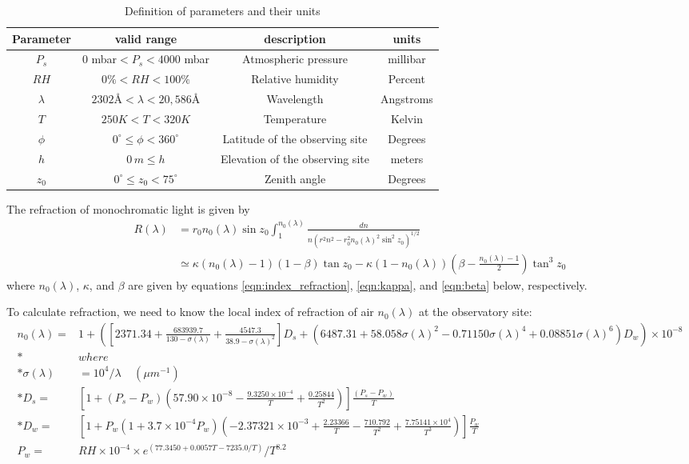 \documentclass[]{article}
\begin{document}
\begin{table}[h!]
	\begin{center}
	\begin{tabular}{c | c | c | c}
		Parameter & valid range & description & units \\
		\hline
		$P_s$& $0$ mbar$ < P_s < 4000$ mbar & Atmospheric pressure & millibar  \\
		$RH$ & $0\% < RH < 100\%$ & Relative humidity & Percent \\
		$\lambda$& $2302$\AA{}$ < \lambda < 20,586 $\AA{} & Wavelength  & Angstroms \\
		$T$& $250K < T < 320K$ & Temperature & Kelvin \\
		$\phi$ & $0^\circ \leq \phi < 360^\circ$ & Latitude of the observing site & Degrees \\
		$h$ & $0\,m\leq h$ & Elevation of the observing site & meters \\
		$z_0$ & $0^\circ\leq z_0 < 75^\circ$ & Zenith angle & Degrees
		
	\end{tabular}
	\end{center}
	\caption{Definition of parameters and their units}
	\label{table:parameters}
\end{table}

The refraction of monochromatic light is given by
\begin{align}
R(\lambda) &= r_0 n_0(\lambda) \sin z_0 \int_1^{n_0(\lambda)} \frac{dn}{n \left(r^2n^2 -r_0^2n_0(\lambda)^2\sin^2z_0\right)^{1/2}} \nonumber\\
&\simeq \kappa (n_0(\lambda) - 1) (1 - \beta) \tan z_0 - \kappa (1 - n_0(\lambda)) \left(\beta - \frac{n_0(\lambda) - 1}{2}\right) \tan^3z_0
\end{align}
where $n_0(\lambda)$, $\kappa$, and $\beta$ are given by equations \ref{eqn:index_refraction}, \ref{eqn:kappa}, and \ref{eqn:beta} below, respectively.

To calculate refraction, we need to know the local index of refraction of air $n_0(\lambda)$ at the observatory site:
\begin{align}
	n_0(\lambda) =&1 + \left(\left[2371.34 +\frac{683939.7}{130 - \sigma(\lambda)} +\frac{4547.3}{38.9 - \sigma(\lambda)^2}\right] D_s 
		+ \left(6487.31 + 58.058 \sigma(\lambda)^2 - 0.71150 \sigma(\lambda)^4 +0.08851 \sigma(\lambda)^6\right) D_w \right)\times 10^{-8} \label{eqn:index_refraction}\\*
	& where \nonumber\\*
	\sigma(\lambda) &= 10^4 /\lambda \;\;\;\;\left(\mu m^{-1}\right)\nonumber \\*
	D_s =& \left[1 + (P_s-P_w) \left(57.90\times10^{-8} - \frac{9.3250\times10^{-4}}{T}+\frac{0.25844}{T^2}\right)\right] \frac{(P_s-P_w)}{T} \nonumber \\*
	D_w =& \left[1 + P_w \left(1 + 3.7\times10^{-4} P_w\right)\left(-2.37321\times10^{-3} + \frac{2.23366}{T} - \frac{710.792}{T^2} + \frac{7.75141\times10^4}{T^3}\right)\right] \frac{P_w}{T} \nonumber \\
	P_w =& RH\times 10^{-4} \times e^{(77.3450 + 0.0057 T - 7235.0/T)}/T^{8.2} \nonumber
\end{align}
\end{document}
